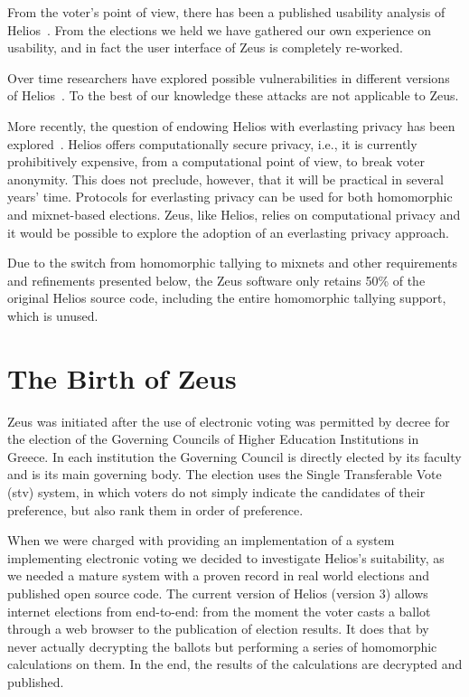 \documentclass[jets]{usenixjournal}
\begin{document}
From the voter's point of view, there has been a published usability
analysis of Helios~\cite{karayumak:2011}. From the
elections we held we have gathered our own experience on usability,
and in fact the user interface of Zeus is completely re-worked.

Over time researchers have explored possible vulnerabilities in
different versions of Helios~\cite{estehghari:2010,heiderich:2011}. To
the best of our knowledge these attacks are not applicable to Zeus.

More recently, the question of endowing Helios with everlasting
privacy has been explored~\cite{demirel:2012}. Helios offers
computationally secure privacy, i.e., it is currently prohibitively
expensive, from a computational point of view, to break voter
anonymity. This does not preclude, however, that it will be
practical in several years' time. Protocols for everlasting privacy
can be used for both homomorphic and mixnet-based elections. Zeus,
like Helios, relies on computational privacy and it would be possible
to explore the adoption of an everlasting privacy approach.

Due to the switch from homomorphic tallying to mixnets and other
requirements and refinements presented below, the Zeus software only
retains 50\% of the original Helios source code, including the entire
homomorphic tallying support, which is unused.

\section{The Birth of Zeus}
\label{sec:birth}

Zeus was initiated after the use of electronic voting was permitted by
decree for the election of the Governing Councils of Higher Education
Institutions in Greece. In each institution the Governing Council is
directly elected by its faculty and is its main governing body. The
election uses the Single Transferable Vote ({\sc stv}) system, in which
voters do not simply indicate the candidates of their preference, but
also rank them in order of preference. 

When we were charged with providing an implementation of a system
implementing electronic voting we decided to investigate Helios's
suitability, as we needed a mature system with a proven record in real
world elections and published open source code. The current version of
Helios (version 3) allows internet elections from end-to-end: from the
moment the voter casts a ballot through a web browser to the
publication of election results. It does that by never actually
decrypting the ballots but performing a series of homomorphic
calculations on them. In the end, the results of the calculations are
decrypted and published. 
\end{document}
